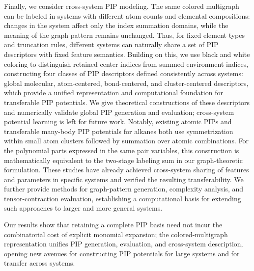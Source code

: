 Finally, we consider cross-system PIP modeling.
The same colored multigraph can be labeled in systems with different atom counts and elemental compositions: changes in the system affect only the index summation domains, while the meaning of the graph pattern remains unchanged.
Thus, for fixed element types and truncation rules, different systems can naturally share a set of PIP descriptors with fixed feature semantics.
Building on this, we use black and white coloring to distinguish retained center indices from summed environment indices, constructing four classes of PIP descriptors defined consistently across systems: global molecular, atom-centered, bond-centered, and cluster-centered descriptors, which provide a unified representation and computational foundation for transferable PIP potentials.
We give theoretical constructions of these descriptors and numerically validate global PIP generation and evaluation; cross-system potential learning is left for future work.
Notably, existing atomic PIPs \cite{Allen2021aPIP} and transferable many-body PIP potentials for alkanes \cite{Qu2025TransferableAlkanes} both use symmetrization within small atom clusters followed by summation over atomic combinations.
For the polynomial parts expressed in the same pair variables, this construction is mathematically equivalent to the two-stage labeling sum in our graph-theoretic formulation.
These studies have already achieved cross-system sharing of features and parameters in specific systems and verified the resulting transferability.
We further provide methods for graph-pattern generation, complexity analysis, and tensor-contraction evaluation, establishing a computational basis for extending such approaches to larger and more general systems.

Our results show that retaining a complete PIP basis need not incur the combinatorial cost of explicit monomial expansion; the colored-multigraph representation unifies PIP generation, evaluation, and cross-system description, opening new avenues for constructing PIP potentials for large systems and for transfer across systems.

